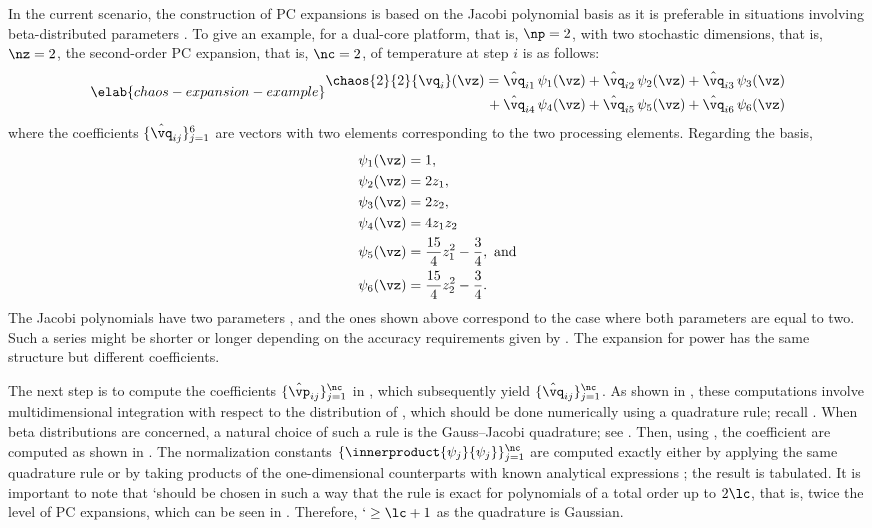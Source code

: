 In the current scenario, the construction of \ac{PC} expansions is based on the
Jacobi polynomial basis as it is preferable in situations involving
beta-distributed parameters \cite{xiu2010}. To give an example, for a dual-core
platform, that is, $\np = 2$, with two stochastic dimensions, that is, $\nz =
2$, the second-order PC expansion, that is, $\nc = 2$, of temperature at step
$i$ is as follows:
\begin{equation} \elab{chaos-expansion-example}
  \begin{split}
    \chaos{2}{2}{\vq_i}(\vz)
    =    {} & \hat{\vq}_{i1} \, \psi_1(\vz) + \hat{\vq}_{i2} \, \psi_2(\vz) + \hat{\vq}_{i3} \, \psi_3(\vz) \\
    {} + {} & \hat{\vq}_{i4} \, \psi_4(\vz) + \hat{\vq}_{i5} \, \psi_5(\vz) + \hat{\vq}_{i6} \, \psi_6(\vz)
  \end{split}
\end{equation}
where the coefficients $\{ \hat{\vq}_{ij} \}_{j = 1}^6$ are vectors with two
elements corresponding to the two processing elements. Regarding the basis,
\begin{align*}
  & \psi_1(\vz) = 1, \\
  & \psi_2(\vz) = 2 z_1, \\
  & \psi_3(\vz) = 2 z_2, \\
  & \psi_4(\vz) = 4 z_1 z_2 \\
  & \psi_5(\vz) = \frac{15}{4} z_1^2 - \frac{3}{4}, \text{ and} \\
  & \psi_6(\vz) = \frac{15}{4} z_2^2 - \frac{3}{4}.
\end{align*}
The Jacobi polynomials have two parameters \cite{xiu2010}, and the ones shown
above correspond to the case where both parameters are equal to two. Such a
series might be shorter or longer depending on the accuracy requirements given
by \lc. The expansion for power has the same structure but different
coefficients.

The next step is to compute the coefficients $\{ \hat{\vp}_{ij} \}_{j = 1}^\nc$
in , which subsequently yield $\{ \hat{\vq}_{ij} \}_{j =
1}^\nc$. As shown in , these computations involve
multidimensional integration with respect to the distribution of \vz, which
should be done numerically using a quadrature rule; recall
. When beta distributions are concerned, a natural
choice of such a rule is the Gauss--Jacobi quadrature; see
. Then, using , the
coefficient are computed as shown in . The normalization
constants $\{ \innerproduct{\psi_j}{\psi_j} \}_{j = 1}^\nc$ are computed exactly
either by applying the same quadrature rule or by taking products of the
one-dimensional counterparts with known analytical expressions \cite{xiu2010};
the result is tabulated. It is important to note that \lq should be chosen in
such a way that the rule is exact for polynomials of a total order up to $2
\lc$, that is, twice the level of \ac{PC} expansions, which can be seen in
 \cite{eldred2008}. Therefore, $\lq \geq \lc + 1$ as the
quadrature is Gaussian.

